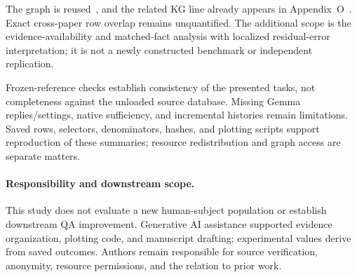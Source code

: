 The graph is reused~\cite{kirpichev2026towards}, and the related KG line already appears in Appendix~O~\cite{anonymousToolGraph}. Exact cross-paper row overlap remains unquantified. The additional scope is the evidence-availability and matched-fact analysis with localized residual-error interpretation; it is not a newly constructed benchmark or independent replication.

Frozen-reference checks establish consistency of the presented tasks, not completeness against the unloaded source database. Missing Gemma replies/settings, native sufficiency, and incremental histories remain limitations. Saved rows, selectors, denominators, hashes, and plotting scripts support reproduction of these summaries; resource redistribution and graph access are separate matters.

\paragraph{Responsibility and downstream scope.}
This study does not evaluate a new human-subject population or establish downstream QA improvement. Generative AI assistance supported evidence organization, plotting code, and manuscript drafting; experimental values derive from saved outcomes. Authors remain responsible for source verification, anonymity, resource permissions, and the relation to prior work.
